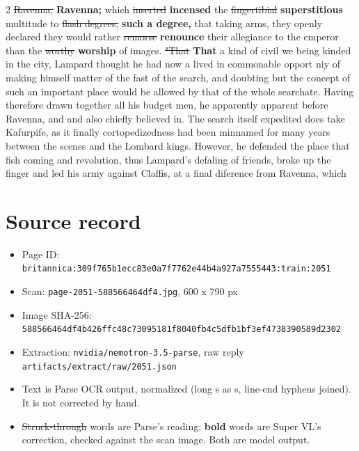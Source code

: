 \documentclass[10pt]{article}
\begin{document}
\begin{multicols}{2}
\sout{Ravenna,} \textbf{Ravenna;} which \sout{inserted} \textbf{incensed} the \sout{fingertibial} \textbf{superstitious} multitude to \sout{flash degrees,} \textbf{such a degree,} that taking arms, they openly declared they would rather \sout{remorse} \textbf{renounce} their allegiance to the emperor than the \sout{worthy} \textbf{worship} of images. \sout{"That} \textbf{That} a kind of civil we being kinded in the city, Lampard thought he had now a lived in commonable opport niy of making himself matter of the fast of the search, and doubting but the concept of such an important place would be allowed by that of the whole searchate. Having therefore drawn together all his budget men, he apparently apparent before Ravenna, and and also chiefly believed in. The search itself expedited does take Kafurpife, as it finally cortopedizedness had been minnamed for many years between the scenes and the Lombard kings. However, he defended the place that fish coming and revolution, thus Lampard's defaling of friends, broke up the finger and led his army against Claffis, at a final diference from Ravenna, which
\end{multicols}
\section*{Source record}
\begin{itemize}
\item Page ID: \texttt{britannica:309f765b1ecc83e0a7f7762e44b4a927a7555443:train:2051}
\item Scan: \texttt{page-2051-588566464df4.jpg}, 600 x 790 px
\item Image SHA-256: \texttt{\small 588566464df4b426ffc48c73095181f8040fb4c5dfb1bf3ef4738390589d2302}
\item Extraction: \texttt{nvidia/nemotron-3.5-parse}, raw reply \texttt{artifacts/extract/raw/2051.json}
\item Text is Parse OCR output, normalized (long s as s, line-end hyphens joined). It is not corrected by hand.
\item \sout{Struck-through} words are Parse's reading; \textbf{bold} words are Super VL's correction, checked against the scan image. Both are model output.
\end{itemize}
\end{document}
